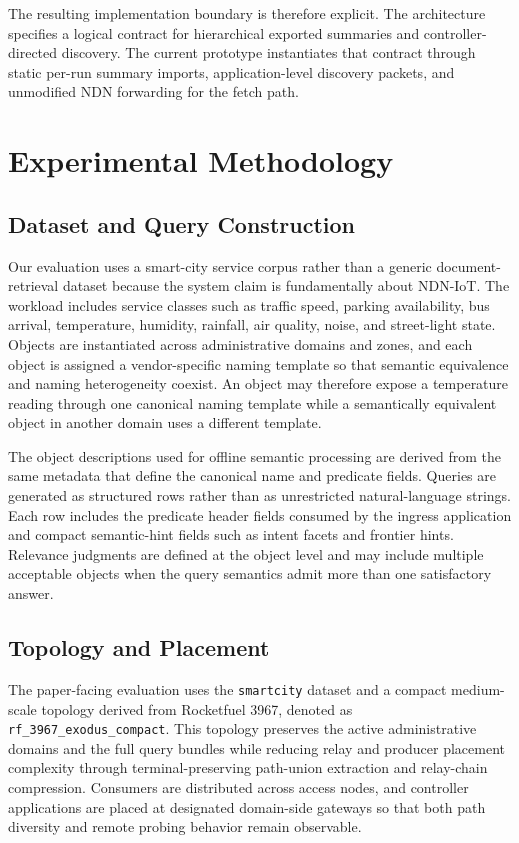 \documentclass[journal]{IEEEtran}
\begin{document}
The resulting implementation boundary is therefore explicit. The architecture specifies a logical contract for hierarchical exported summaries and controller-directed discovery. The current prototype instantiates that contract through static per-run summary imports, application-level discovery packets, and unmodified NDN forwarding for the fetch path.

\section{Experimental Methodology}

\subsection{Dataset and Query Construction}

Our evaluation uses a smart-city service corpus rather than a generic document-retrieval dataset because the system claim is fundamentally about NDN-IoT. The workload includes service classes such as traffic speed, parking availability, bus arrival, temperature, humidity, rainfall, air quality, noise, and street-light state. Objects are instantiated across administrative domains and zones, and each object is assigned a vendor-specific naming template so that semantic equivalence and naming heterogeneity coexist. An object may therefore expose a temperature reading through one canonical naming template while a semantically equivalent object in another domain uses a different template.

The object descriptions used for offline semantic processing are derived from the same metadata that define the canonical name and predicate fields. Queries are generated as structured rows rather than as unrestricted natural-language strings. Each row includes the predicate header fields consumed by the ingress application and compact semantic-hint fields such as intent facets and frontier hints. Relevance judgments are defined at the object level and may include multiple acceptable objects when the query semantics admit more than one satisfactory answer.

\subsection{Topology and Placement}

The paper-facing evaluation uses the \texttt{smartcity} dataset and a compact medium-scale topology derived from Rocketfuel 3967, denoted as \texttt{rf\_3967\_exodus\_compact}. This topology preserves the active administrative domains and the full query bundles while reducing relay and producer placement complexity through terminal-preserving path-union extraction and relay-chain compression. Consumers are distributed across access nodes, and controller applications are placed at designated domain-side gateways so that both path diversity and remote probing behavior remain observable.
\end{document}
